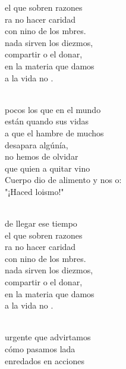 \begin{cancion}
\begin{chorus}
	el que sobren razones\\
	ra no hacer caridad \\
	con nino de los mbres.\\
	nada sirven los diezmos,\\
	compartir o el donar,\\
	 en la materia que damos\\
	a la vida no .   \\
	\end{chorus}%
	\jump\\
	 pocos los que en el mundo \\
	están quando sus vidas\\
	a que el hambre de muchos \\
	desapara algúnía,\\
	 no hemos de olvidar \\
	que quien a quitar vino\\
	Cuerpo dio de alimento y nos o:\\
	"¡Haced loismo!"\\\jump\\
	\begin{chorus}%
	de llegar ese tiempo \\
	el que sobren razones\\
	ra no hacer caridad \\
	con nino de los mbres.\\
	nada sirven los diezmos,\\
	compartir o el donar,\\
	 en la materia que damos\\
	a la vida no .   \\
	\end{chorus}%
	\jump\\
	urgente que advirtamos \\
	cómo pasamos lada\\
enredados en acciones \\

\end{cancion}
